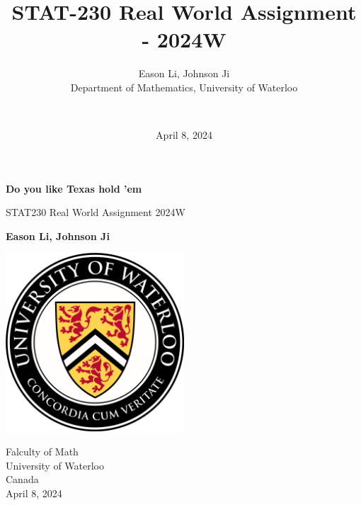 \documentclass{article}
\title{STAT-230 Real World Assignment - 2024W}
\author{
    Eason Li, Johnson Ji \\
    Department of Mathematics, University of Waterloo \and \\
}
\date{April 8, 2024} %
\begin{document}
\begin{titlepage}
    \begin{center}
        \vspace*{1cm}
            
        \Huge
        \textbf{Do you like Texas hold 'em}
            
        \vspace{0.5cm}
        \LARGE
        STAT230 Real World Assignment 2024W
            
        \vspace{1.5cm}
            
        \textbf{Eason Li, Johnson Ji}
            
        \vspace{3.6cm}
        
        \begin{center}
            \includegraphics[width = 0.5\textwidth]{UofLoo.png}
        \end{center}

        \vspace{0.4cm}
            
        \Large
        Falculty of Math \\
        University of Waterloo \\
        Canada \\
        April 8, 2024
    \end{center}
\end{titlepage}

\newpage
\end{document}

